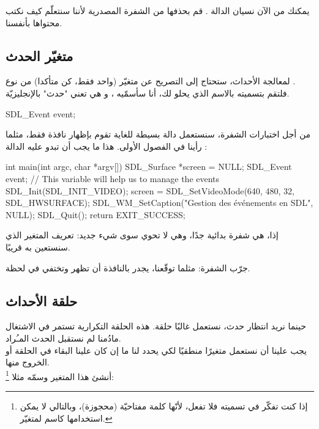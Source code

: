 \begin{information}
يمكنك من الآن نسيان الدالة
.
قم بحذفها من الشفرة المصدرية لأننا سنتعلّم كيف نكتب محتواها بأنفسنا.
\end{information}

\subsection{متغيّر الحدث}

لمعالجة الأحداث، ستحتاج إلى التصريح عن متغيّر (واحد فقط، كن متأكدا) من نوع 
.\\
فلتقم بتسميته بالاسم الذي يحلو لك، أنا سأسمّيه 
،
و هي تعني "حدث" بالإنجليزيّة.

\begin{Csource}
SDL_Event event;
\end{Csource}

من أجل اختبارات الشفرة، سنستعمل دالة
بسيطة للغاية تقوم بإظهار نافذة فقط، مثلما رأينا في الفصول الأولى. هذا ما يجب أن تبدو عليه الدالة
:

\begin{Csource}
int main(int argc, char *argv[])
{
	SDL_Surface *screen = NULL;
	SDL_Event event; // This variable will help us to manage the events
	SDL_Init(SDL_INIT_VIDEO);
	screen = SDL_SetVideoMode(640, 480, 32, SDL_HWSURFACE);
	SDL_WM_SetCaption("Gestion des événements en SDL", NULL);
	SDL_Quit();
	return EXIT_SUCCESS;
}
\end{Csource}

إذا، هي شفرة بدائية جدًا، وهي لا تحوي سوى شيء جديد: تعريف المتغير
الذي سنستعين به قريبًا.

جرّب الشفرة: مثلما توقّعنا، يجدر بالنافذة أن تظهر وتختفي في لحظة.

\subsection{حلقة الأحداث}

حينما نريد انتظار حدث، نستعمل غالبًا حلقة. هذه الحلقة التكرارية تستمر في الاشتغال مادُمنا لم نستقبل الحدث المـُراد.\\
يجب علينا أن نستعمل متغيرًا منطقيًا لكي يحدد لنا ما إن كان علينا البقاء في الحلقة أو الخروج منها.\\
أنشئ هذا المتغير وسمّه مثلا
\footnote{
إذا كنت تفكّر في تسميته
فلا تفعل، لأنّها كلمة مفتاحيّة (محجوزة)، وبالتالي لا يمكن استخدامها كاسم لمتغيّر.}:

